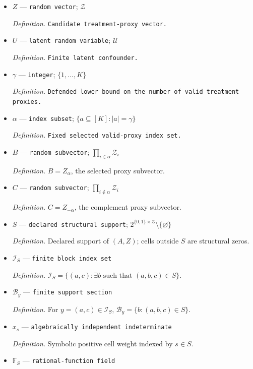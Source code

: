 \documentclass{article}
\begin{document}
\begin{itemize}
  \item \(Z\) --- \texttt{random vector}; \(\mathcal Z\)
  \par\smallskip\noindent\emph{Definition.} \texttt{Candidate treatment-\allowbreak{}proxy vector.}
  \item \(U\) --- \texttt{latent random variable}; \(\mathcal U\)
  \par\smallskip\noindent\emph{Definition.} \texttt{Finite latent confounder.}
  \item \(\gamma\) --- \texttt{integer}; \(\{1,\ldots,K\}\)
  \par\smallskip\noindent\emph{Definition.} \texttt{Defended lower bound on the number of valid treatment proxies.}
  \item \(\alpha\) --- \texttt{index subset}; \(\{a\subseteq[K]:|a|=\gamma\}\)
  \par\smallskip\noindent\emph{Definition.} \texttt{Fixed selected valid-\allowbreak{}proxy index set.}
  \item \(B\) --- \texttt{random subvector}; \(\prod_{i\in\alpha}\mathcal Z_i\)
  \par\smallskip\noindent\emph{Definition.} \(B=Z_\alpha\), the selected proxy subvector.
  \item \(C\) --- \texttt{random subvector}; \(\prod_{i\notin\alpha}\mathcal Z_i\)
  \par\smallskip\noindent\emph{Definition.} \(C=Z_{-\alpha}\), the complement proxy subvector.
  \item \(S\) --- \texttt{declared structural support}; \(2^{\{0,1\}\times\mathcal Z}\setminus\{\varnothing\}\)
  \par\smallskip\noindent\emph{Definition.} Declared support of \((A,Z)\); cells outside \(S\) are structural zeros.
  \item \(\mathcal I_S\) --- \texttt{finite block index set}
  \par\smallskip\noindent\emph{Definition.} \(\mathcal I_S=\{(a,c):\exists b\text{ such that }(a,b,c)\in S\}\).
  \item \(\mathcal B_y\) --- \texttt{finite support section}
  \par\smallskip\noindent\emph{Definition.} For \(y=(a,c)\in\mathcal I_S\), \(\mathcal B_y=\{b:(a,b,c)\in S\}\).
  \item \(x_s\) --- \texttt{algebraically independent indeterminate}
  \par\smallskip\noindent\emph{Definition.} Symbolic positive cell weight indexed by \(s\in S\).
  \item \(\mathbb F_S\) --- \texttt{rational-\allowbreak{}function field}

\end{itemize}
\end{document}
